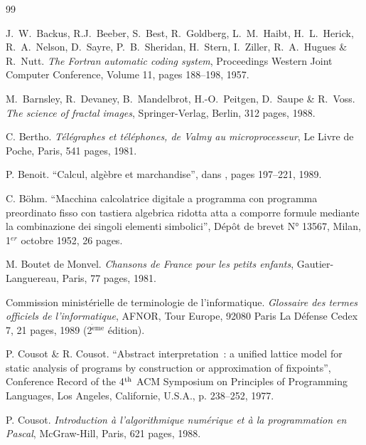 \begin{thebibliography}{99}

\vfill

 J.~W.~Backus, R.J.~Beeber, S.~Best, R.~Goldberg, 
L.~M.~Haibt, H.~L.~Herick, R.~A.~Nelson, D.~Sayre, P.~B.~Sheridan, H.~Stern,
I.~Ziller, R.~A.~Hugues \& R.~Nutt.
{\em The Fortran automatic coding system}, 
Proceedings Western Joint Computer Conference, Volume 11, 
pages 188--198, 1957.

 M.~Barnsley, R.~Devaney, B.~Mandelbrot,
H.-O.~Peitgen, D.~Saupe \& R.~Voss.
{\em The science of fractal images}, Springer-Verlag, Berlin, 312 pages, 1988.

 C. Bertho.
{\em Télégraphes et téléphones, de Valmy au microprocesseur}, 
Le Livre de Poche, Paris, 541 pages, 1981.

 P. Benoit.
``Calcul, algèbre et marchandise'', \rm dans \cite{serres1}, pages 197--221, 1989.

 C. Böhm.
``Macchina calcolatrice digitale a programma con programma preordinato fisso con
tastiera algebrica ridotta atta a comporre formule mediante la
combinazione dei singoli elementi simbolici'', Dépôt de brevet N° 13567, Milan,
1$^{er}$ octobre 1952, 26 pages.

 M. Boutet de Monvel.
{\em Chansons de France pour les petits enfants}, 
Gautier-Languereau, Paris, 77 pages, 1981.

\thispagestyle{empty}

 Commission ministérielle de terminologie de l'informatique.
{\em Glossaire des termes officiels de l'informatique}, AFNOR, Tour Europe, 92080 Paris
La Défense Cedex 7, 21 pages, 1989 (2$^{\mathrm{\grave{e}me}}$ édition).

 P. Cousot \& R. Cousot.
``Abstract interpretation~: a unified lattice model for static analysis
of programs by construction or approximation of fixpoints'', Conference
Record of the 4$^{\rm th}$ ACM Symposium on Principles of Programming
Languages, Los Angeles, Californie, U.S.A., p. 238--252, 1977.

 P. Cousot.
{\em Introduction à l'algorithmique numérique et à la 
programmation en Pascal}, McGraw-Hill, Paris, 621 pages, 1988.



\end{thebibliography}
